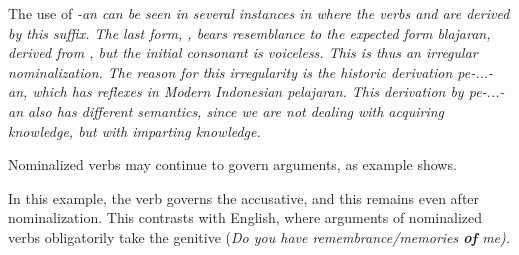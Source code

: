 
The use of \em -an \em can be seen in several instances in  where the verbs  and  are derived by this suffix. The last form, , bears resemblance to the expected form \em *blajaran\em, derived from , but the initial consonant is voiceless. This is thus an irregular nominalization. The reason for this irregularity is the historic derivation \em pe-...-an\em, which has reflexes in Modern Indonesian \em pelajaran\em. This derivation by \em pe-...-an \em also has  different semantics, since we are not dealing with acquiring knowledge, but with imparting knowledge.




Nominalized verbs may continue to govern arguments, as example  shows.


In this example, the verb  governs the accusative, and this remains even after nominalization. This contrasts with English, where arguments of nominalized verbs obligatorily take the genitive  (\em Do you have remembrance/memories \textbf{of} me\em).

